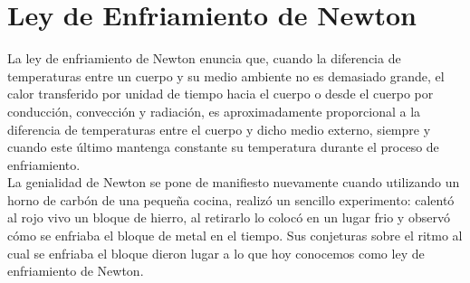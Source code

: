 \section*{Ley de Enfriamiento de Newton}
La ley de enfriamiento de Newton enuncia que, cuando la diferencia de temperaturas entre un cuerpo y su medio ambiente no es demasiado grande, el calor transferido por unidad de tiempo hacia el cuerpo o desde el cuerpo por conducción, convección y radiación, es aproximadamente proporcional a la diferencia de temperaturas entre el cuerpo y dicho medio externo, siempre y cuando este último mantenga constante su temperatura durante el proceso de enfriamiento.\\ 

La genialidad de Newton se pone de manifiesto nuevamente cuando utilizando un horno de carbón de una pequeña cocina, realizó un sencillo experimento: calentó al rojo vivo un bloque de hierro, al retirarlo lo colocó en un lugar frio y observó cómo se enfriaba el bloque de metal en el tiempo. Sus conjeturas sobre el ritmo al cual se enfriaba el bloque dieron lugar a lo que hoy conocemos como ley de enfriamiento de Newton. 